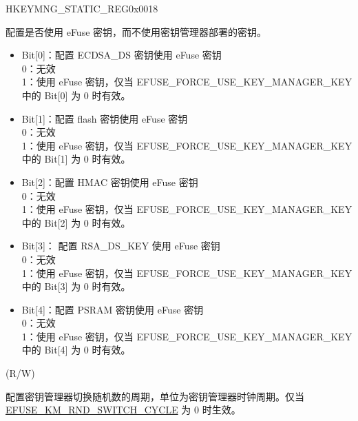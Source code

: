 \begin{register}{H}{KEYMNG\_STATIC\_REG}{0x0018}\label{regdesc:KEYMNGSTATICREG}
%
%
%
%
%
%
\regnewline%
\begin{regdesc}\begin{reglist}
\label{fielddesc:KEYMNGUSEEFUSEKEY}\item [KEYMNG\_USE\_EFUSE\_KEY] 配置是否使用 eFuse 密钥，而不使用密钥管理器部署的密钥。\\
\begin{itemize}
    \item Bit[0]：配置 ECDSA\_DS 密钥使用 eFuse 密钥\\
        0：无效\\
        1：使用 eFuse 密钥，仅当 EFUSE\_FORCE\_USE\_KEY\_MANAGER\_KEY 中的 Bit[0] 为 0 时有效。\\
    \item Bit[1]：配置 flash 密钥使用 eFuse 密钥\\
        0：无效\\
        1：使用 eFuse 密钥，仅当 EFUSE\_FORCE\_USE\_KEY\_MANAGER\_KEY 中的 Bit[1] 为 0 时有效。\\
    \item Bit[2]：配置 HMAC 密钥使用 eFuse 密钥 \\
        0：无效\\
        1：使用 eFuse 密钥，仅当 EFUSE\_FORCE\_USE\_KEY\_MANAGER\_KEY 中的 Bit[2] 为 0 时有效。\\
    \item Bit[3]： 配置 RSA\_DS\_KEY 使用 eFuse 密钥 \\
        0：无效\\
        1：使用 eFuse 密钥，仅当 EFUSE\_FORCE\_USE\_KEY\_MANAGER\_KEY 中的 Bit[3] 为 0 时有效。\\
    \item Bit[4]：配置 PSRAM 密钥使用 eFuse 密钥 \\
        0：无效\\
        1：使用 eFuse 密钥，仅当 EFUSE\_FORCE\_USE\_KEY\_MANAGER\_KEY 中的 Bit[4] 为 0 时有效。\\
\end{itemize}
(R/W)
\label{fielddesc:KEYMNGRNDSWITCHCYCLE}\item [KEYMNG\_RND\_SWITCH\_CYCLE] 配置密钥管理器切换随机数的周期，单位为密钥管理器时钟周期。仅当 \hyperref[fielddesc:EFUSEKMRNDSWITCHCYCLE]{EFUSE\_KM\_RND\_SWITCH\_CYCLE} 为 0 时生效。\\

\end{reglist}
\end{regdesc}
\end{register}
